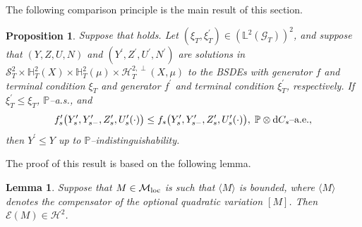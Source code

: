\documentclass[10pt]{article} %
\newtheorem{lemma}[theorem]{Lemma}
\newtheorem{proposition}[theorem]{Proposition}
\newcommand\cE{\mathcal E}
\newcommand\cG{\mathcal G}
\newcommand\cH{\mathcal H}
\newcommand\cM{\mathcal M}
\newcommand\cS{\mathcal S}
\def \H{\mathbb{H}}
\def \L{\mathbb{L}}
\def \P{\mathbb{P}}
\def\d{\mathrm{d}}
\begin{document}
The following comparison principle is the main result of this section.

\begin{proposition}\label{prop::comparison}
	Suppose that {\rm{}} holds. Let $(\xi_T,\xi^\prime_T) \in (\L^2(\cG_T))^2$, and suppose that $(Y,Z,U,N)$ and $(Y^\prime,Z^\prime,U^\prime,N^\prime)$ are solutions in $\cS^2_T \times \H^2_T(X) \times \H^2_T(\mu) \times \cH^{2,\perp}_T(X,\mu)$ to the {\rm BSDEs} with generator $f$ and terminal condition $\xi_T$ and generator $f^\prime$ and terminal condition $\xi^\prime_T$, respectively. If $\xi^\prime_T \leq \xi_T$, $\P${\rm--a.s.}, and
	\begin{equation*}
		f^\prime_s\big(Y^\prime_s,Y^\prime_{s-},Z^\prime_s,U^\prime_s(\cdot)\big) \leq f_s\big(Y^\prime_s,Y^\prime_{s-},Z^\prime_s,U^\prime_s(\cdot)\big), \; \text{$\P \otimes \d C_s$\rm--a.e.},
	\end{equation*}
	 then $Y^\prime \leq Y$ up to $\P$--indistinguishability.	
\end{proposition}

The proof of this result is based on the following lemma.

\begin{lemma}\label{lem::stoch_exp}
	Suppose that $M \in \cM_\text{\rm loc}$ is such that $\langle M \rangle$ is bounded, where $\langle M \rangle$ denotes the compensator of the optional quadratic variation $[M]$. Then $\cE(M) \in \cH^2$.
\end{lemma}
\end{document}
